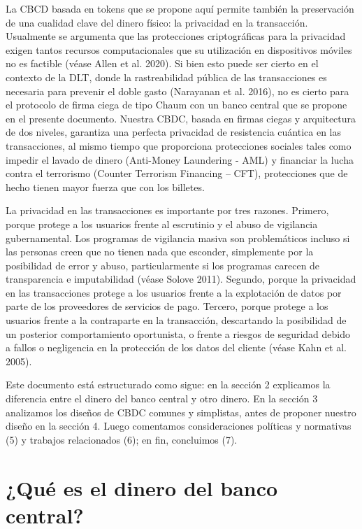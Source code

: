 \documentclass[10pt,spanish]{article}
\begin{document}
La CBCD basada en tokens que se propone aquí permite también la
preservación de una cualidad clave del dinero físico: la privacidad en
la transacción. Usualmente se argumenta que las protecciones
criptográficas para la privacidad exigen tantos recursos computacionales
que su utilización en dispositivos móviles no es factible (véase Allen
et al. 2020). Si bien esto puede ser cierto en el contexto de la DLT,
donde la rastreabilidad pública de las transacciones es necesaria para
prevenir el doble gasto (Narayanan et al. 2016), no es cierto para el
protocolo de firma ciega de tipo Chaum con un banco central que se
propone en el presente documento. Nuestra CBDC, basada en firmas ciegas
y arquitectura de dos niveles, garantiza una perfecta privacidad de
resistencia cuántica en las transacciones, al mismo tiempo que
proporciona protecciones sociales tales como impedir el lavado de dinero
(Anti-Money Laundering - AML) y financiar la lucha contra el terrorismo
(Counter Terrorism Financing -- CFT), protecciones que de hecho tienen
mayor fuerza que con los billetes.

La privacidad en las transacciones es importante por tres razones.
Primero, porque protege a los usuarios frente al escrutinio y el abuso
de vigilancia gubernamental. Los programas de vigilancia masiva son
problemáticos incluso si las personas creen que no tienen nada que
esconder, simplemente por la posibilidad de error y abuso,
particularmente si los programas carecen de transparencia e
imputabilidad (véase Solove 2011). Segundo, porque la privacidad en las
transacciones protege a los usuarios frente a la explotación de datos por parte
de los proveedores de servicios de pago.
Tercero, porque protege a los usuarios frente a la contraparte en la
transacción, descartando la posibilidad de un posterior comportamiento
oportunista, o frente a riesgos de seguridad debido a fallos o
negligencia en la protección de los datos del cliente (véase Kahn et al.
2005).

Este documento está estructurado como sigue: en la sección 2 explicamos
la diferencia entre el dinero del banco central y otro dinero. En la
sección 3 analizamos los diseños de CBDC comunes y simplistas, antes
de proponer nuestro diseño en la sección 4. Luego comentamos
consideraciones políticas y normativas (5) y trabajos relacionados (6);
en fin, concluimos (7).

\hypertarget{quuxe9-es-el-dinero-del-banco-central}{%
\section{¿Qué es el dinero del banco central?} \label{2.-quuxe9-es-el-dinero-del-banco-central}}
\end{document}
